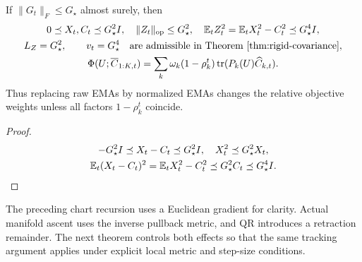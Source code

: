 \begin{proposition}\label{prop:rigid-raw-ema}
If $\|G_t\|_F\le G_\star$ almost surely, then
\begin{gather}
 0\preceq X_t,C_t\preceq G_\star^2I,\quad
 \|Z_t\|_{\mathrm{op}}\le G_\star^2,\quad
 \mathbb E_tZ_t^2=\mathbb E_tX_t^2-C_t^2\preceq G_\star^4I,\\
 L_Z=G_\star^2,\qquad v_t=G_\star^4
 \quad\text{are admissible in Theorem~\ref{thm:rigid-covariance}},\\
 \Phi(U;\overline C_{1:K,t})
 =\sum_k\omega_k(1-\rho_k^t)\operatorname{tr}(P_k(U)\widehat C_{k,t}).
\end{gather}
Thus replacing raw EMAs by normalized EMAs changes the relative objective weights
unless all factors $1-\rho_k^t$ coincide.
\end{proposition}
\begin{proof}
\begin{gather}
 -G_\star^2I\preceq X_t-C_t\preceq G_\star^2I,\quad
 X_t^2\preceq G_\star^2X_t,\\
 \mathbb E_t(X_t-C_t)^2=\mathbb E_tX_t^2-C_t^2
 \preceq G_\star^2 C_t\preceq G_\star^4I.
\end{gather}
\end{proof}
The preceding chart recursion uses a Euclidean gradient for clarity. Actual
manifold ascent uses the inverse pullback metric, and QR introduces a retraction
remainder. The next theorem controls both effects so that the same tracking
argument applies under explicit local metric and step-size conditions.

